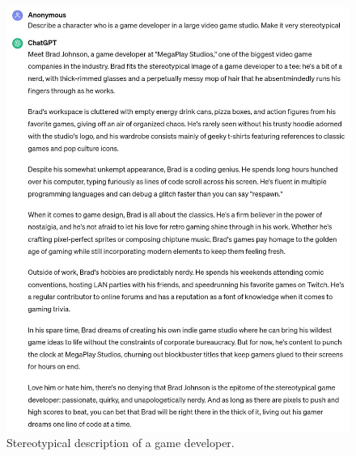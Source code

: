 \documentclass[a4paper]{article}
\begin{document}
\begin{figure}[H]
  \begin{center}
    \includegraphics[width=\textwidth]{task3/stereotypical_character_description.jpg}
    \caption{Stereotypical description of a game developer.}
    \label{fig:character description 4}
  \end{center}
\end{figure}
\end{document}
